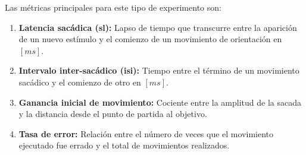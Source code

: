 \documentclass[../main.tex]{subfiles}
\begin{document}
		Las métricas principales para este tipo de experimento son:
		\begin{enumerate}
		 	\item \textbf{Latencia sacádica (\acrshort{sl}):} Lapso de tiempo que transcurre entre la aparición de un nuevo estímulo y el comienzo de un movimiento de orientación en $[ms]$. 

		 	\item \textbf{Intervalo inter-sacádico (\acrshort{isi}):} Tiempo entre el término de un movimiento sacádico y el comienzo de otro en $[ms]$.
		 	
		 	\item \textbf{Ganancia inicial de movimiento:} Cociente entre la amplitud de la sacada y la distancia desde el punto de partida al objetivo. 
		 	
		 	\item \textbf{Tasa de error:} Relación entre el número de veces que el movimiento ejecutado fue errado y el total de movimientos realizados. 

		 \end{enumerate} 
\end{document}

